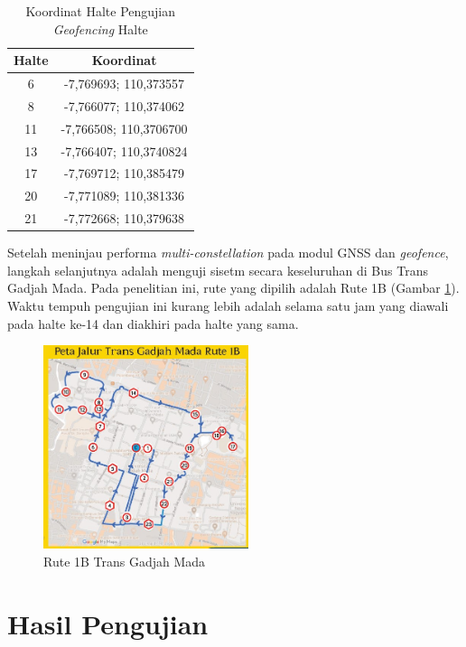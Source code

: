 \documentclass[conference]{IEEEtran}
\begin{document}
\begin{table}[hbt!]
	\caption{Koordinat Halte Pengujian \textit{Geofencing} Halte}
	\centering
	\renewcommand{\arraystretch}{1.5}
	\begin{tabular}{cc}
		\hline
		\textbf{Halte} & \textbf{Koordinat} \\\hline
		6 & -7,769693; 110,373557 \\
		8 &-7,766077; 110,374062\\ 
		11 &-7,766508; 110,3706700\\
		13 & -7,766407; 110,3740824\\
		17 &-7,769712; 110,385479\\ 
		20 & -7,771089; 110,381336\\
		21 & -7,772668; 110,379638\\
		\hline
	\end{tabular}
	\label{tab: 3-geof-halte}
\end{table}

Setelah meninjau performa \textit{multi-constellation} pada modul GNSS dan \textit{geofence}, langkah selanjutnya adalah menguji sisetm secara keseluruhan di Bus Trans Gadjah Mada. Pada penelitian ini, rute yang dipilih adalah Rute 1B (Gambar \ref{fig: tgm-1b}). Waktu tempuh pengujian ini kurang lebih adalah selama satu jam yang diawali pada halte ke-14 dan diakhiri pada halte yang sama.

\begin{figure}[hbt!]
	\centering
	\includegraphics[width=6cm]{Peta-Jalur-Rute-1B.jpg}
	\caption{Rute 1B Trans Gadjah Mada}
	\label{fig: tgm-1b}
\end{figure}

\section{Hasil Pengujian}
\end{document}
